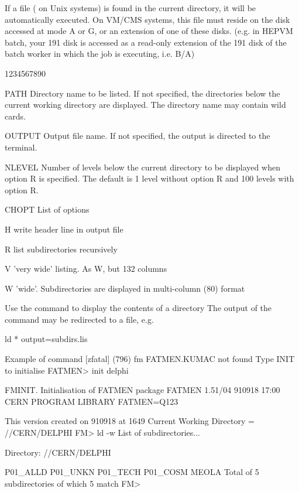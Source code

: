 If a file  ( on Unix systems) is found in
the current directory, it will be automatically executed. On VM/CMS
systems, this file must reside on the disk accessed at mode A or G,
or an extension of one of these disks. (e.g. in HEPVM batch, your
191 disk is accessed as a read-only extension of the 191 disk of 
the batch worker in which the job is executing, i.e. B/A)
\begin{DLtt}{1234567890}
\item[PATH]Directory name to be listed. If not specified,
the directories below the current working directory are displayed.
The directory name may contain wild cards.
\item[OUTPUT]Output file name. If not specified, the output is
directed to the terminal.
\item[NLEVEL]Number of levels below the current directory to be
displayed when option R is specified. The default is 1 level
without option R and 100 levels with option R.
\item[CHOPT]List of options
\begin{DLtt}{12}
\item[H]write header line in output file
\item[R]list subdirectories recursively
\item[V]'very wide' listing. As W, but 132 columns
\item[W]'wide'. Subdirectories are displayed in multi-column (80) format
\end{DLtt}
\end{DLtt}
Use the  command to display the contents of a directory
The output of the command may be redirected to a file, e.g.
\begin{XMP}
ld * output=subdirs.lis
\end{XMP}
\begin{XMPt}{Example of \protect{} command}
[zfatal] (796) fm
 FATMEN.KUMAC not found
 Type INIT to initialise FATMEN> init delphi
  
 FMINIT.  Initialisation of FATMEN package
 FATMEN   1.51/04 910918 17:00 CERN PROGRAM LIBRARY FATMEN=Q123                 
 
          This version created on      910918  at        1649 
 Current Working Directory = //CERN/DELPHI
 FM> ld -w
 List of subdirectories...
 
 Directory: //CERN/DELPHI
 
 P01_ALLD P01_UNKN P01_TECH P01_COSM MEOLA 
 Total of          5 subdirectories of which          5 match
 FM>
\end{XMPt}
